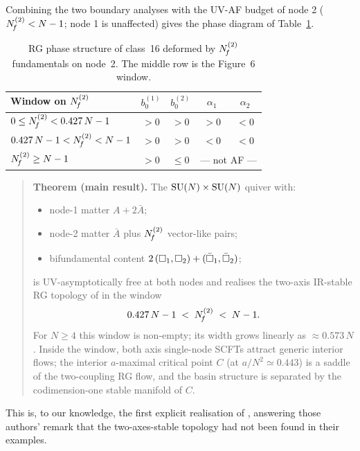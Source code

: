 Combining the two boundary analyses with the UV-AF budget of
node 2 ($N_{\!f}^{(2)}<N-1$; node 1 is unaffected) gives the phase
diagram of Table~\ref{tab:class16-phases}.

\begin{table}[h]
  \centering
  \begin{tabular}{lcccc}
    \toprule
    Window on $N_{\!f}^{(2)}$ & $b_{0}^{(1)}$ & $b_{0}^{(2)}$
                          & $\alpha_{1}$  & $\alpha_{2}$
                          \\
    \midrule
    $0\le N_{\!f}^{(2)}<0.427\,N-1$ & $>0$ & $>0$ & $>0$ & $<0$ \\
    $0.427\,N-1<N_{\!f}^{(2)}<N-1$  & $>0$ & $>0$ & $<0$ & $<0$ \\
    $N_{\!f}^{(2)}\ge N-1$          & $>0$ & $\le 0$ & \multicolumn{2}{c}{--- not AF ---} \\
    \bottomrule
  \end{tabular}
  \caption{RG phase structure of class~16 deformed by
    $N_{\!f}^{(2)}$ fundamentals on node~2.  The middle row is the
    Figure~6 window.}
  \label{tab:class16-phases}
\end{table}

\begin{quote}
  \textbf{Theorem (main result).}  The $\mathrm{SU}(N)\times\mathrm{SU}(N)$ quiver
  with:
  \begin{itemize}\setlength{\itemsep}{1pt}
    \item node-1 matter $A+2\bar A$;
    \item node-2 matter $\bar A$ plus $N_{\!f}^{(2)}$ vector-like
      pairs;
    \item bifundamental content
      $2\,(\square_{1},\square_{2})+(\bar{\square}_{1},\bar{\square}_{2})$;
  \end{itemize}
  is UV-asymptotically free at both nodes and realises the two-axis
  IR-stable RG topology of \cite[Fig.~6]{IW2005} in the window
  \begin{equation}
    0.427\,N-1\;<\;N_{\!f}^{(2)}\;<\;N-1.
    \label{eq:main-theorem-window}
  \end{equation}
  For $N\ge 4$ this window is non-empty; its width grows linearly as
  $\approx 0.573\,N$.  Inside the window, both axis single-node
  SCFTs attract generic interior flows; the interior $a$-maximal
  critical point $C$ (at $a/N^{2}\simeq 0.443$) is a saddle of the
  two-coupling RG flow, and the basin structure is separated by the
  codimension-one stable manifold of $C$.
\end{quote}

This is, to our knowledge, the first explicit realisation of
\cite[Fig.~6]{IW2005}, answering those authors' remark that the
two-axes-stable topology had not been found in their examples.

